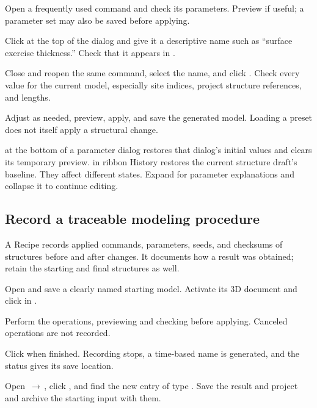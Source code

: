 \begin{steps}
  \item Open a frequently used command and check its parameters. Preview if useful; a parameter set may also be saved before applying.
  \item Click  at the top of the dialog and give it a descriptive name such as ``surface exercise thickness.'' Check that it appears in .
  \item Close and reopen the same command, select the name, and click . Check every value for the current model, especially site indices, project structure references, and lengths.
  \item Adjust as needed, preview, apply, and save the generated model. Loading a preset does not itself apply a structural change.
\end{steps}

 at the bottom of a parameter dialog restores that dialog's initial values and clears its temporary preview.  in ribbon History restores the current structure draft's baseline. They affect different states. Expand  for parameter explanations and collapse it to continue editing.

\subsection{Record a traceable modeling procedure}\label{sec:modeling-recipe-reference}

A Recipe records applied commands, parameters, seeds, and checksums of structures before and after changes. It documents how a result was obtained; retain the starting and final structures as well.

\begin{steps}
  \item Open and save a clearly named starting model. Activate its 3D document and click  in .
  \item Perform the operations, previewing and checking before applying. Canceled operations are not recorded.
  \item Click  when finished. Recording stops, a time-based name is generated, and the status gives its save location.
  \item Open \,$\rightarrow$\,, click , and find the new entry of type . Save the result and project and archive the starting input with them.
\end{steps}

